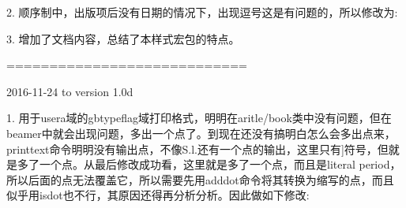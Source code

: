 2. 顺序制中，出版项后没有日期的情况下，出现逗号这是有问题的，所以修改为:
\begin{texlist}
\end{texlist}

3. 增加了文档内容，总结了本样式宏包的特点。

============================

2016-11-24 to version 1.0d

1. 用于usera域的gbtypeflag域打印格式，明明在aritle/book类中没有问题，但在beamer中就会出现问题，多出一个点了。到现在还没有搞明白怎么会多出点来，printtext命令明明没有输出点，不像S.l.还有一个点的输出，这里只有]符号，但就是多了一个点。从最后修改成功看，这里就是多了一个点，而且是literal period，所以后面的点无法覆盖它，所以需要先用adddot命令将其转换为缩写的点，而且似乎用isdot也不行，其原因还得再分析分析。因此做如下修改:


